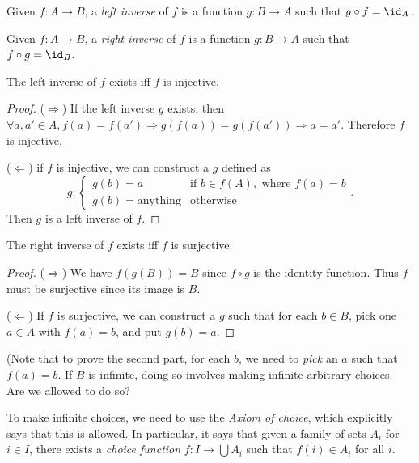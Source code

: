 \documentclass[a4paper]{article}
\begin{document}
\begin{defi}
  Given $f: A\to B$, a \emph{left inverse} of $f$ is a function $g:B\to A$ such that $g\circ f = \id _A$.
\end{defi}

\begin{defi}
  Given $f: A\to B$, a \emph{right inverse} of $f$ is a function $g:B\to A$ such that $f\circ g = \id _B$.
\end{defi}

\begin{thm}
  The left inverse of $f$ exists iff $f$ is injective.
\end{thm}

\begin{proof}
  ($\Rightarrow$)
  If the left inverse $g$ exists, then $\forall a, a'\in A, f(a) = f(a') \Rightarrow g( f(a))=g(f(a'))\Rightarrow a=a'$. Therefore $f$ is injective.

  ($\Leftarrow$) if $f$ is injective, we can construct a $g$ defined as
  \[
    g: \begin{cases}
      g(b) = a &\text{if }b\in f(A), \text{ where }f(a) = b\\
      g(b) = \text{anything} & \text{otherwise}
    \end{cases}.
  \]
  Then $g$ is a left inverse of $f$.
\end{proof}

\begin{thm}
  The right inverse of $f$ exists iff $f$ is surjective.
\end{thm}

\begin{proof}
  ($\Rightarrow$) We have $f(g(B)) = B$ since $f\circ g$ is the identity function. Thus $f$ must be surjective since its image is $B$.

  ($\Leftarrow$) If $f$ is surjective, we can construct a $g$ such that for each $b\in B$, pick one $a\in A$ with $f(a) = b$, and put $g(b) = a$.
\end{proof}

(Note that to prove the second part, for each $b$, we need to \emph{pick} an $a$ such that $f(a) = b$. If $B$ is infinite, doing so involves making infinite arbitrary choices. Are we allowed to do so?

To make infinite choices, we need to use the \emph{Axiom of choice}, which explicitly says that this is allowed. In particular, it says that given a family of sets $A_i$ for $i \in I$, there exists a \emph{choice function} $f: I \to \bigcup A_i$ such that $f(i)\in A_i$ for all $i$.
\end{document}
